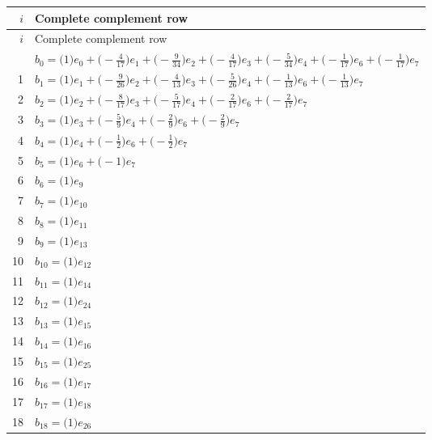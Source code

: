 \begingroup\footnotesize
\setlength{\tabcolsep}{5pt}
\begin{longtable}{@{}rP{.82\linewidth}@{}}
\toprule
$i$ & Complete complement row\\
\midrule\endfirsthead
\toprule
$i$ & Complete complement row\\
\midrule\endhead
\bottomrule{} & $b_{0}=\bigl(1\bigr)e_{0}+\allowbreak \bigl(-\frac{4}{17}\bigr)e_{1}+\allowbreak \bigl(-\frac{9}{34}\bigr)e_{2}+\allowbreak \bigl(-\frac{4}{17}\bigr)e_{3}+\allowbreak \bigl(-\frac{5}{34}\bigr)e_{4}+\allowbreak \bigl(-\frac{1}{17}\bigr)e_{6}+\allowbreak \bigl(-\frac{1}{17}\bigr)e_{7}$\\
1 & $b_{1}=\bigl(1\bigr)e_{1}+\allowbreak \bigl(-\frac{9}{26}\bigr)e_{2}+\allowbreak \bigl(-\frac{4}{13}\bigr)e_{3}+\allowbreak \bigl(-\frac{5}{26}\bigr)e_{4}+\allowbreak \bigl(-\frac{1}{13}\bigr)e_{6}+\allowbreak \bigl(-\frac{1}{13}\bigr)e_{7}$\\
2 & $b_{2}=\bigl(1\bigr)e_{2}+\allowbreak \bigl(-\frac{8}{17}\bigr)e_{3}+\allowbreak \bigl(-\frac{5}{17}\bigr)e_{4}+\allowbreak \bigl(-\frac{2}{17}\bigr)e_{6}+\allowbreak \bigl(-\frac{2}{17}\bigr)e_{7}$\\
3 & $b_{3}=\bigl(1\bigr)e_{3}+\allowbreak \bigl(-\frac{5}{9}\bigr)e_{4}+\allowbreak \bigl(-\frac{2}{9}\bigr)e_{6}+\allowbreak \bigl(-\frac{2}{9}\bigr)e_{7}$\\
4 & $b_{4}=\bigl(1\bigr)e_{4}+\allowbreak \bigl(-\frac{1}{2}\bigr)e_{6}+\allowbreak \bigl(-\frac{1}{2}\bigr)e_{7}$\\
5 & $b_{5}=\bigl(1\bigr)e_{6}+\allowbreak \bigl(-1\bigr)e_{7}$\\
6 & $b_{6}=\bigl(1\bigr)e_{9}$\\
7 & $b_{7}=\bigl(1\bigr)e_{10}$\\
8 & $b_{8}=\bigl(1\bigr)e_{11}$\\
9 & $b_{9}=\bigl(1\bigr)e_{13}$\\
10 & $b_{10}=\bigl(1\bigr)e_{12}$\\
11 & $b_{11}=\bigl(1\bigr)e_{14}$\\
12 & $b_{12}=\bigl(1\bigr)e_{24}$\\
13 & $b_{13}=\bigl(1\bigr)e_{15}$\\
14 & $b_{14}=\bigl(1\bigr)e_{16}$\\
15 & $b_{15}=\bigl(1\bigr)e_{25}$\\
16 & $b_{16}=\bigl(1\bigr)e_{17}$\\
17 & $b_{17}=\bigl(1\bigr)e_{18}$\\
18 & $b_{18}=\bigl(1\bigr)e_{26}$\\

\end{longtable}
